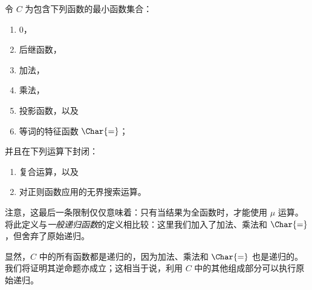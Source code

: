 \documentclass[../../../include/open-logic-section]{subfiles}
\begin{document}

令 $C$ 为包含下列函数的最小函数集合：

\begin{enumerate}
\item $0$，
\item 后继函数，
\item 加法，
\item 乘法，
\item 投影函数，以及
\item 等词的特征函数 $\Char{=}$；
\end{enumerate}

并且在下列运算下封闭：

\begin{enumerate}
\item 复合运算，以及
\item 对正则函数应用的无界搜索运算。
\end{enumerate}

注意，这最后一条限制仅仅意味着：只有当结果为全函数时，才能使用 $\mu$ 运算。
将此定义与\emph{一般递归函数}的定义相比较：这里我们加入了加法、乘法和 $\Char{=}$，但舍弃了原始递归。

显然，$C$ 中的所有函数都是递归的，因为加法、乘法和 $\Char{=}$ 也是递归的。
我们将证明其逆命题亦成立；这相当于说，利用 $C$ 中的其他组成部分可以执行原始递归。
\end{document}
